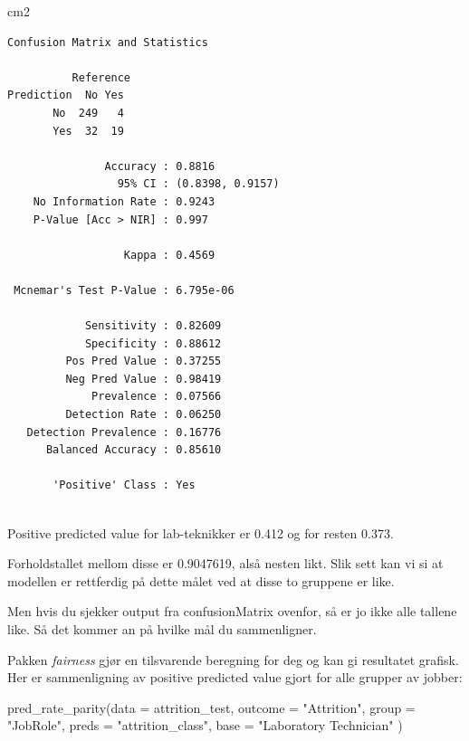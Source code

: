 \documentclass[
  letterpaper,
  DIV=11,
  numbers=noendperiod]{scrreprt}
\newenvironment{Shaded}{\begin{snugshade}}{\end{snugshade}}
\newcommand{\AttributeTok}[1]{\textcolor[rgb]{0.40,0.45,0.13}{#1}}
\newcommand{\FunctionTok}[1]{\textcolor[rgb]{0.28,0.35,0.67}{#1}}
\newcommand{\NormalTok}[1]{\textcolor[rgb]{0.00,0.23,0.31}{#1}}
\newcommand{\StringTok}[1]{\textcolor[rgb]{0.13,0.47,0.30}{#1}}
\begin{document}
\begin{Shaded}
\begin{Highlighting}[]
\NormalTok{cm2}
\end{Highlighting}
\end{Shaded}

\begin{verbatim}
Confusion Matrix and Statistics

          Reference
Prediction  No Yes
       No  249   4
       Yes  32  19
                                          
               Accuracy : 0.8816          
                 95% CI : (0.8398, 0.9157)
    No Information Rate : 0.9243          
    P-Value [Acc > NIR] : 0.997           
                                          
                  Kappa : 0.4569          
                                          
 Mcnemar's Test P-Value : 6.795e-06       
                                          
            Sensitivity : 0.82609         
            Specificity : 0.88612         
         Pos Pred Value : 0.37255         
         Neg Pred Value : 0.98419         
             Prevalence : 0.07566         
         Detection Rate : 0.06250         
   Detection Prevalence : 0.16776         
      Balanced Accuracy : 0.85610         
                                          
       'Positive' Class : Yes             
                                          
\end{verbatim}

Positive predicted value for lab-teknikker er 0.412 og for resten 0.373.

Forholdstallet mellom disse er 0.9047619, alså nesten likt. Slik sett
kan vi si at modellen er rettferdig på dette målet ved at disse to
gruppene er like.

Men hvis du sjekker output fra confusionMatrix ovenfor, så er jo ikke
alle tallene like. Så det kommer an på hvilke mål du sammenligner.

Pakken \emph{fairness} gjør en tilsvarende beregning for deg og kan gi
resultatet grafisk. Her er sammenligning av positive predicted value
gjort for alle grupper av jobber:

\begin{Shaded}
\begin{Highlighting}[]
\FunctionTok{pred\_rate\_parity}\NormalTok{(}\AttributeTok{data =}\NormalTok{ attrition\_test,}
                 \AttributeTok{outcome =} \StringTok{"Attrition"}\NormalTok{, }
                 \AttributeTok{group =} \StringTok{"JobRole"}\NormalTok{, }
                 \AttributeTok{preds =} \StringTok{"attrition\_class"}\NormalTok{, }
                 \AttributeTok{base =} \StringTok{"Laboratory Technician"}
\NormalTok{                 )}
\end{Highlighting}
\end{Shaded}
\end{document}
